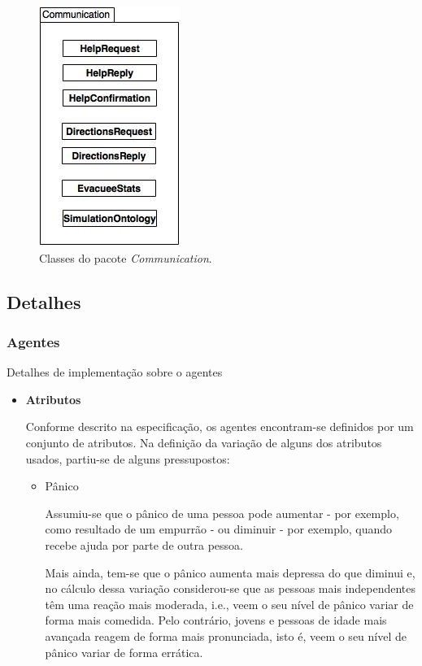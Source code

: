 \documentclass[12pt]{article}
\begin{document}
\begin{titlepage}
\begin{figure}[H]
	\centering
	\includegraphics[scale=0.5]{communication.jpg}
	\caption{Classes do pacote \textit{Communication}.}
	\label{uml}
\end{figure}

\subsection{Detalhes}
\subsubsection{Agentes}
Detalhes de implementação sobre o agentes

\begin{itemize}
	
\item \textbf{Atributos}

Conforme descrito na especificação, os agentes encontram-se definidos por um conjunto de atributos.
Na definição da variação de alguns dos atributos usados, partiu-se de alguns pressupostos:

\begin{itemize}
\item Pânico

Assumiu-se que o pânico de uma pessoa pode aumentar - por exemplo, como resultado de um empurrão - ou diminuir - por exemplo, quando recebe ajuda por parte de outra pessoa. 

Mais ainda, tem-se que o pânico aumenta mais depressa do que diminui e, no cálculo dessa variação considerou-se que as pessoas mais independentes têm uma reação mais moderada, i.e., veem o seu nível de pânico variar de forma mais comedida. Pelo contrário, jovens e pessoas de idade mais avançada reagem de forma mais pronunciada, isto é, veem o seu nível de pânico variar de forma errática.


\end{itemize}
\end{itemize}
\end{titlepage}
\end{document}
